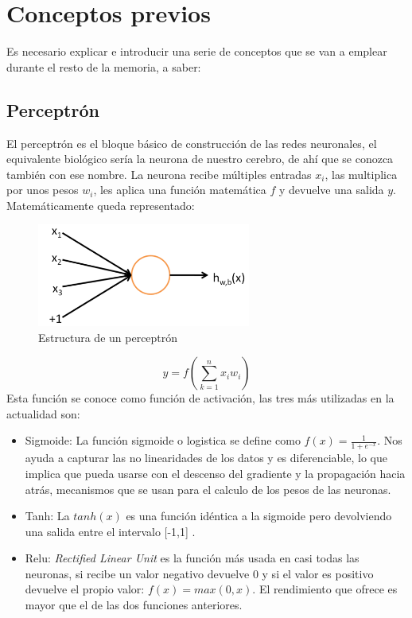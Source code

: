 \documentclass[a4paper, 12pt]{book}
\begin{document}
\section{Conceptos previos}
\label{sec:conceptos_previos}
Es necesario explicar e introducir una serie de conceptos que se van a emplear durante el resto de la memoria, a saber:

\subsection{Perceptrón}
\label{sec:perceptron}
El perceptrón es el bloque básico de construcción de las redes neuronales, el equivalente biológico sería la neurona de nuestro cerebro, de ahí que se conozca también con ese nombre. La neurona recibe múltiples entradas $x_i$, las multiplica por unos pesos $w_i$, les aplica una función matemática $f$ y devuelve una salida $y$. Matemáticamente queda representado:
\begin{figure}
  \centering
  \includegraphics[width=7cm, keepaspectratio]{img/neuron}
  \caption{Estructura de un perceptrón}
  \label{fig:neuron}
\end{figure}
\begin{equation}
 y = f({ \sum_{k=1}^{n} x_i w_i})
\end{equation}
Esta función se conoce como función de activación, las tres más utilizadas en la actualidad son:
\begin{itemize}
  \item Sigmoide: La función sigmoide o logistica se define como $f(x) = \frac{1}{1+e^{-x}}$. Nos ayuda a capturar las no linearidades de los datos y es diferenciable, lo que implica que pueda usarse con el descenso del gradiente y la  propagación hacia atrás, mecanismos que se usan para el calculo de los pesos de las neuronas.
  \item Tanh: La $tanh(x)$ es una función idéntica a la sigmoide pero devolviendo una salida entre el intervalo [-1,1] .
  \item Relu: \emph{Rectified Linear Unit} es la función más usada en casi todas las neuronas, si recibe un valor negativo devuelve 0 y si el valor es positivo devuelve el propio valor: $f(x) = max(0,x)$. El rendimiento que ofrece es mayor que el de las dos funciones anteriores.
  
\end{itemize}
\end{document}
